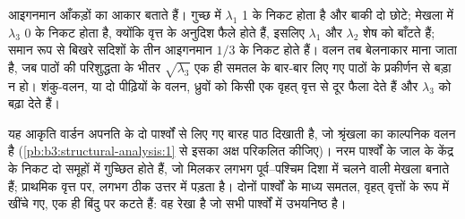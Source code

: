 आइगनमान आँकड़ों का आकार बताते हैं। गुच्छ में $\lambda_1$
1 के निकट होता है और बाकी दो छोटे; मेखला में $\lambda_3$ 0 के निकट होता है,
क्योंकि  वृत्त के अनुदिश फैले होते हैं, इसलिए $\lambda_1$ और $\lambda_2$ शेष को बाँटते हैं;
समान रूप से बिखरे सदिशों के तीन आइगनमान $1/3$ के निकट होते हैं। वलन तब बेलनाकार
माना जाता है, जब पाठों की परिशुद्धता के भीतर $\sqrt{\lambda_3}$ एक ही समतल के
बार-बार लिए गए पाठों के प्रकीर्णन से बड़ा न हो। शंकु-वलन, या दो पीढ़ियों के वलन,
ध्रुवों को किसी एक वृहत् वृत्त से दूर फैला देते हैं
और $\lambda_3$ को बढ़ा देते हैं।

यह आकृति वार्डन अपनति के दो पार्श्वों से लिए गए बारह पाठ
दिखाती है, जो श्रृंखला का काल्पनिक वलन है (\cref{pb:b3:structural-analysis:1}
से इसका अक्ष परिकलित कीजिए)। नरम पार्श्वों के  जाल के केंद्र के निकट
दो समूहों में गुच्छित होते हैं, जो मिलकर लगभग
पूर्व--पश्चिम दिशा में चलने वाली मेखला बनाते हैं;  प्राथमिक वृत्त पर, लगभग ठीक उत्तर में पड़ता है। दोनों पार्श्वों के माध्य
समतल, वृहत् वृत्तों के रूप में खींचे गए, एक ही बिंदु पर कटते हैं:
 वह रेखा है जो सभी पार्श्वों में उभयनिष्ठ है।

